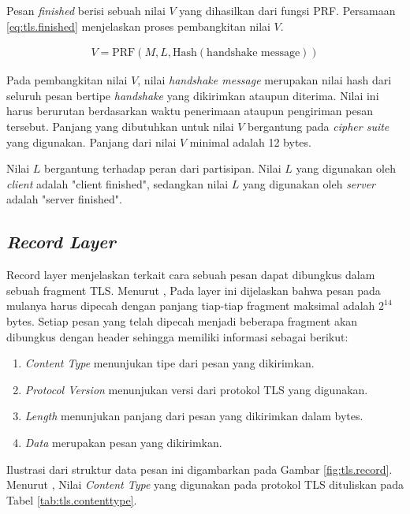 Pesan \emph{finished} berisi sebuah nilai $V$ yang dihasilkan dari fungsi PRF. Persamaan \ref{eq:tls.finished} menjelaskan proses pembangkitan nilai $V$.

\begin{equation}
  \label{eq:tls.finished}
  \begin{array}{l}
    V = \text{PRF}(M, L, \text{Hash}(\text{handshake message}))
  \end{array}
\end{equation}

Pada pembangkitan nilai $V$, nilai \emph{handshake message} merupakan nilai hash dari seluruh pesan bertipe \emph{handshake} yang dikirimkan ataupun diterima. Nilai ini harus berurutan berdasarkan waktu penerimaan ataupun pengiriman pesan tersebut. Panjang yang dibutuhkan untuk nilai $V$ bergantung pada \emph{cipher suite} yang digunakan. Panjang dari nilai $V$ minimal adalah 12 bytes.

Nilai $L$ bergantung terhadap peran dari partisipan. Nilai $L$ yang digunakan oleh \emph{client} adalah "client finished", sedangkan nilai $L$ yang digunakan oleh \emph{server} adalah "server finished".

\subsection{\emph{Record Layer}}
Record layer menjelaskan terkait cara sebuah pesan dapat dibungkus dalam sebuah fragment TLS. Menurut \textcite{rfc5246}, Pada layer ini dijelaskan bahwa pesan pada mulanya harus dipecah dengan panjang tiap-tiap fragment maksimal adalah $2^14$ bytes. Setiap pesan yang telah dipecah menjadi beberapa fragment akan dibungkus dengan header sehingga memiliki informasi sebagai berikut:

\begin{enumerate}
  \item \emph{Content Type} menunjukan tipe dari pesan yang dikirimkan.
  \item \emph{Protocol Version} menunjukan versi dari protokol TLS yang digunakan.
  \item \emph{Length} menunjukan panjang dari pesan yang dikirimkan dalam bytes.
  \item \emph{Data} merupakan pesan yang dikirimkan.
\end{enumerate}

Ilustrasi dari struktur data pesan ini digambarkan pada Gambar \ref{fig:tls.record}. Menurut \textcite{rfc5246}, Nilai \emph{Content Type} yang digunakan pada protokol TLS dituliskan pada Tabel \ref{tab:tls.contenttype}.

